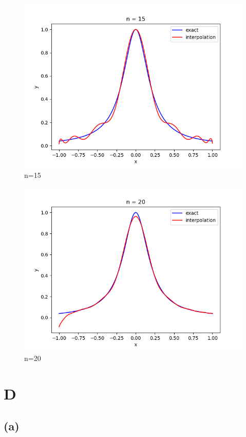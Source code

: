 \documentclass{article}
\begin{document}
    \begin{figure}[H]
        \centering
        \includegraphics{../code/output/C_n15.png}
        \caption{n=15}
    \end{figure} 

    \begin{figure}[H]
        \centering
        \includegraphics{../code/output/C_n20.png}
        \caption{n=20}
    \end{figure} 

\section{D}
    \subsection{(a)}
    
\end{document}
